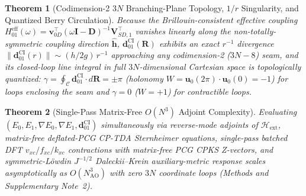 \documentclass[10pt,twocolumn]{article}
\theoremstyle{natthm}
\newtheorem{theorem}{Theorem}
\newcommand{\Hext}{\mathcal{H}_{\mathrm{ext}}}
\newcommand{\dCI}{\mathbf{d}_{01}^{\mathrm{CI}}}
\begin{document}
\begin{theorem}[Codimension-2 $3N$ Branching-Plane Topology, $1/r$ Singularity, and Quantized Berry Circulation]
Because the Brillouin-consistent effective coupling $H_{01}^{\mathrm{eff}}(\omega)=\mathbf{v}_{0D}^\top(\omega\mathbf{I}-\mathbf{D})^{-1}\mathbf{V}_{SD,1}^\top$ vanishes linearly along the non-totally-symmetric coupling direction $\hat{\mathbf{h}}$, $\dCI(\mathbf{R})$ exhibits an exact $r^{-1}$ divergence $\|\dCI(r)\|\sim(h/2g)\,r^{-1}$ approaching any codimension-2 ($3N{-}8$) seam, and its closed-loop line integral in full $3N$-dimensional Cartesian space is topologically quantized: $\gamma=\oint_{\mathcal{C}}\dCI\cdot d\mathbf{R}=\pm\pi$ (holonomy $W=\mathbf{u}_0(2\pi)\cdot\mathbf{u}_0(0)=-1$) for loops enclosing the seam and $\gamma=0$ ($W=+1$) for contractible loops.
\end{theorem}

\begin{theorem}[Single-Pass Matrix-Free $O(N^3)$ Adjoint Complexity]
Evaluating $(E_0, E_1, \nabla E_0, \nabla E_1, \dCI)$ simultaneously via reverse-mode adjoints of $\Hext$, matrix-free deflated-PCG CP-TDA Sternheimer equations, single-pass batched DFT $v_{xc}/f_{xc}/k_{xc}$ contractions with matrix-free PCG CPKS Z-vectors\cite{handy1984zvec,furche2002}, and symmetric-L\"owdin $J^{-1/2}$ Daleckii--Krein auxiliary-metric response\cite{daleckii1956} scales asymptotically as $O(N_{\mathrm{AO}}^3)$ with zero $3N$ coordinate loops (Methods and Supplementary Note~2).
\end{theorem}
\end{document}
